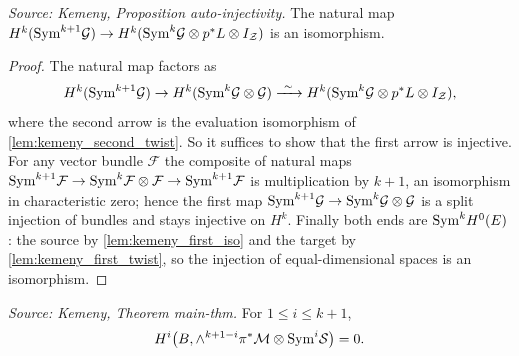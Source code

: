 \begin{proposition}
  \label{prop:kemeny_auto_injectivity}
  \textit{Source: Kemeny, Proposition auto-injectivity.}
  The natural map
  \(H^k(\mathrm{Sym}^{k+1}\mathcal{G})\to H^k(\mathrm{Sym}^k\mathcal{G}\otimes p^*L\otimes I_{\mathcal{Z}})\) is an
  isomorphism.
\end{proposition}

\begin{proof}
  The natural map factors as
  \[
    H^k(\mathrm{Sym}^{k+1}\mathcal{G})\to H^k(\mathrm{Sym}^k\mathcal{G}\otimes\mathcal{G})
      \xrightarrow{\ \sim\ }H^k(\mathrm{Sym}^k\mathcal{G}\otimes p^*L\otimes I_{\mathcal{Z}}),
  \]
  where the second arrow is the evaluation isomorphism of
  \cref{lem:kemeny_second_twist}.  So it suffices to show that the first arrow is
  injective.  For any vector bundle \(\mathcal F\) the composite of natural maps
  \(\mathrm{Sym}^{k+1}\mathcal F\to \mathrm{Sym}^k\mathcal F\otimes\mathcal F\to
   \mathrm{Sym}^{k+1}\mathcal F\) is multiplication by \(k+1\), an isomorphism in
  characteristic zero; hence the first map
  \(\mathrm{Sym}^{k+1}\mathcal{G}\to\mathrm{Sym}^k\mathcal{G}\otimes\mathcal{G}\) is a split injection of bundles and
  stays injective on \(H^k\).  Finally both ends are \(\mathrm{Sym}^kH^0(E)\): the source
  by \cref{lem:kemeny_first_iso} and the target by
  \cref{lem:kemeny_first_twist}, so the injection of equal-dimensional spaces is
  an isomorphism.
\end{proof}

\begin{theorem}
  \label{thm:kemeny_even_secant_vanishing}
  \textit{Source: Kemeny, Theorem main-thm.}
  For \(1\le i\le k+1\),
  \[
    H^i\bigl(B,\wedge^{k+1-i}\pi^*\mathcal{M}\otimes\mathrm{Sym}^i\mathcal{S}\bigr)=0 .
  \]
\end{theorem}

